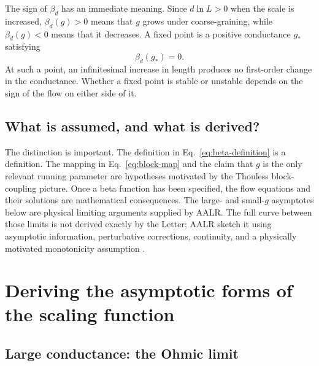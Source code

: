 \documentclass[11pt,a4paper]{article}
\numberwithin{equation}{section}
\begin{document}
The sign of $\beta_d$ has an immediate meaning. Since $d\ln L>0$ when the scale is increased, $\beta_d(g)>0$ means that $g$ grows under coarse-graining, while $\beta_d(g)<0$ means that it decreases. A fixed point is a positive conductance $g_*$ satisfying
\begin{equation}
    \beta_d(g_*)=0.
    \label{eq:fixed-point}
\end{equation}
At such a point, an infinitesimal increase in length produces no first-order change in the conductance. Whether a fixed point is stable or unstable depends on the sign of the flow on either side of it.

\subsection{What is assumed, and what is derived?}

The distinction is important. The definition in Eq.~\eqref{eq:beta-definition} is a definition. The mapping in Eq.~\eqref{eq:block-map} and the claim that $g$ is the only relevant running parameter are hypotheses motivated by the Thouless block-coupling picture. Once a beta function has been specified, the flow equations and their solutions are mathematical consequences. The large- and small-$g$ asymptotes below are physical limiting arguments supplied by AALR. The full curve between those limits is not derived exactly by the Letter; AALR sketch it using asymptotic information, perturbative corrections, continuity, and a physically motivated monotonicity assumption \cite{AALR1979}.

\section{Deriving the asymptotic forms of the scaling function}

\subsection{Large conductance: the Ohmic limit}
\end{document}
